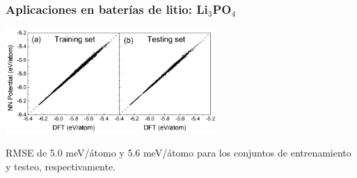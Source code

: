 \documentclass[aspectratio=169]{beamer}
\begin{document}
    \begin{frame}
        \frametitle{Aplicaciones en baterías de litio: Li$_3$PO$_4$}

        \begin{center}
            \includegraphics[width=0.6\textwidth]{Li3PO4-training_testing.png}
        \end{center}

        RMSE de 5.0 meV/átomo y 5.6 meV/átomo para los conjuntos de entrenamiento
        y testeo, respectivamente.

    \end{frame}
\end{document}

